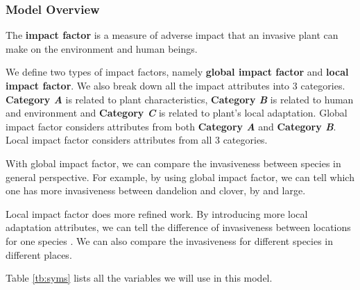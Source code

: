 \documentclass[12pt]{article}
\begin{document}
	\subsubsection{Model Overview}
		
		The \textbf{impact factor} is a measure of adverse impact that an invasive plant can make on the environment and human beings.  
		
		We define two types of impact factors, namely \textbf{global impact factor} and \textbf{local impact factor}.  We also break down all the impact attributes into 3 categories.  \textbf{Category \textit{A}} is related to plant characteristics, \textbf{Category \textit{B}} is related to human and environment and \textbf{Category \textit{C}} is related to plant's local adaptation.  Global impact factor considers attributes from both \textbf{Category \textit{A}} and \textbf{Category \textit{B}}.  Local impact factor considers attributes from all 3 categories.
		
		With global impact factor, we can compare the invasiveness between species in general perspective.  For example, by using global impact factor, we can tell which one has more invasiveness between dandelion and clover, by and large.
		
		Local impact factor does more refined work.  By introducing more local adaptation attributes, we can tell the difference of invasiveness between locations for one species .  We can also compare the invasiveness for different species in different places.
		
		Table \ref{tb:syms} lists all the variables we will use in this model.
		
\end{document}
